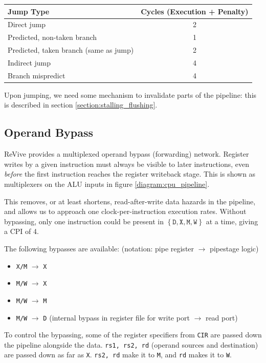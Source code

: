 \documentclass{article}
\begin{document}
\begin{center}
\begin{tabular}{l c}
\hline
Jump Type & Cycles (Execution + Penalty) \\
\hline
Direct jump & 2 \\
Predicted, non-taken branch & 1 \\
Predicted, taken branch (same as jump) & 2 \\
Indirect jump & 4 \\
Branch mispredict & 4 \\
\hline
\end{tabular}
\end{center}

Upon jumping, we need some mechanism to invalidate parts of the pipeline: this is described in section \ref{section:stalling_flushing}.

\subsection{Operand Bypass}

ReVive provides a multiplexed operand bypass (forwarding) network. Register writes by a given instruction must always be visible to later instructions, even \textit{before} the first instruction reaches the register writeback stage. This is shown as multiplexers on the ALU inputs in figure \ref{diagram:cpu_pipeline}.

This removes, or at least shortens, read-after-write data hazards in the pipeline, and allows us to approach one clock-per-instruction execution rates. Without bypassing, only one instruction could be present in $\left\{ \texttt{D}, \texttt{X}, \texttt{M}, \texttt{W} \right\}$ at a time, giving a CPI of 4.

The following bypasses are available: (notation: pipe register $\to$ pipestage logic)

\begin{itemize}
	\item \texttt{X/M} $\to$ \texttt{X}
	\item \texttt{M/W} $\to$ \texttt{X}
	\item \texttt{M/W} $\to$ \texttt{M}
	\item \texttt{M/W} $\to$ \texttt{D} (internal bypass in register file for write port $\to$ read port)
\end{itemize}

To control the bypassing, some of the register specifiers from \texttt{CIR} are passed down the pipeline alongside the data. \texttt{rs1, rs2, rd} (operand sources and destination) are passed down as far as \texttt{X}. \texttt{rs2, rd} make it to \texttt{M}, and \texttt{rd} makes it to \texttt{W}.
\end{document}
